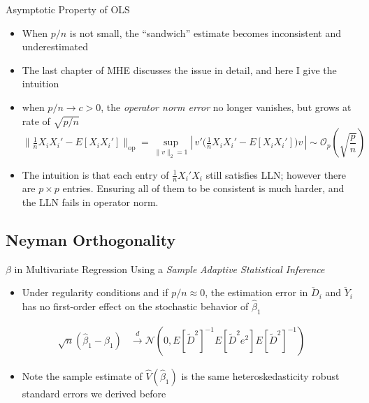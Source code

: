 \documentclass[aspectratio=1610,12pt,xcolor=dvipsnames]{beamer}
\begin{document}
\begin{frame}{Asymptotic Property of OLS}

\begin{itemize}
    \item When $p/n$ is not small, the ``sandwich'' estimate becomes inconsistent and underestimated
    \item The last chapter of \textsc{MHE} discusses the issue in detail, and here I give the intuition
    \item when $p/n \rightarrow c > 0$, the \textit{operator norm error} no longer vanishes, but grows at rate of $\sqrt{p/n}$
    $$
    \Big\|\tfrac{1}{n}X_iX_i' - E[X_iX_i']\Big\|_{\mathrm{op}}
    = \sup_{\|v\|_2=1} \left|\,v'\Big(\tfrac{1}{n}X_iX_i' - E[X_iX_i']\Big)v\,\right| \sim \mathcal{O}_p(\sqrt{\frac{p}{n}})
    $$
    \item The intuition is that each entry of $\tfrac{1}{n}X_i'X_i$ still satisfies LLN; however there are $p \times p$ entries. Ensuring all of them to be consistent is much harder, and the LLN fails in operator norm.
\end{itemize}
\end{frame}

\subsection{Neyman Orthogonality}

\begin{frame}
  \subsectionpage
\end{frame}

\begin{frame}{$\beta$ in Multivariate Regression Using a \textit{Sample}}
 \textit{Adaptive Statistical Inference}
 \begin{itemize}
     \item Under regularity conditions and if $p/n \approx 0$, the estimation error in $\check{D}_i$ and $\check{Y}_i$ has no first-order effect on the stochastic behavior of $\hat{\beta}_1$
 \end{itemize}
 \begin{align*}
     \sqrt{n} (\hat \beta_1 - \beta_1) &\xrightarrow{d} \mathcal{N}\left(0, E[\tilde{D}^2]^{-1}E[\tilde{D}^2e^2]E[\tilde{D}^2]^{-1}\right)
 \end{align*}
  \begin{itemize}
     \item Note the sample estimate of $\hat V(\hat \beta_1)$ is the same heteroskedasticity robust standard errors we derived before
 \end{itemize}
\end{frame}
\end{document}
